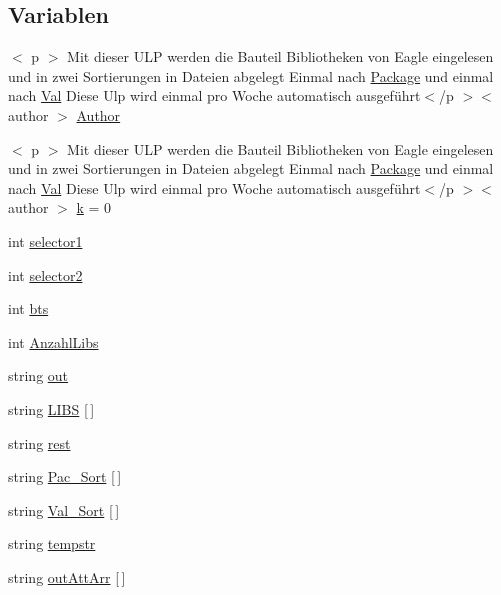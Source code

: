 \subsection*{Variablen}
\begin{DoxyCompactItemize}
\item 
$<$ p $>$ Mit dieser U\+L\+P werden die Bauteil Bibliotheken von Eagle eingelesen und in zwei Sortierungen in Dateien abgelegt Einmal nach \hyperlink{test_8ulp_a36b57fe679881487796855a589fbfb85}{Package} und einmal nach \hyperlink{test_8ulp_a088204f20433deace071409889b5aba1}{Val} Diese Ulp wird einmal pro Woche automatisch ausgeführt$<$/p $>$$<$ author $>$ \hyperlink{readlibs_8ulp_a5060269beb44f9737d13fd98bf0b8f7f}{Author}
\item 
$<$ p $>$ Mit dieser U\+L\+P werden die Bauteil Bibliotheken von Eagle eingelesen und in zwei Sortierungen in Dateien abgelegt Einmal nach \hyperlink{test_8ulp_a36b57fe679881487796855a589fbfb85}{Package} und einmal nach \hyperlink{test_8ulp_a088204f20433deace071409889b5aba1}{Val} Diese Ulp wird einmal pro Woche automatisch ausgeführt$<$/p $>$$<$ author $>$ \hyperlink{readlibs_8ulp_ac4f6835ed9b8d2035ccbb5c7c557fcfc}{k} = 0
\item 
int \hyperlink{readlibs_8ulp_a2f0524c519c9a079ebbe76797552cfff}{selector1}
\item 
int \hyperlink{readlibs_8ulp_acb22ea06df7a98062b750ecca56f1628}{selector2}
\item 
int \hyperlink{readlibs_8ulp_a00c6cb851706bdde7570b25efe80733a}{bts}
\item 
int \hyperlink{readlibs_8ulp_a6e91c7aa482f3c0a8d826efd565190a3}{Anzahl\+Libs}
\item 
string \hyperlink{readlibs_8ulp_a43b9274914173cbec050c89b07f1824b}{out}
\item 
string \hyperlink{readlibs_8ulp_ab79ee21fe4aae7937f99de5b9c7b7d2c}{L\+I\+B\+S} \mbox{[}$\,$\mbox{]}
\item 
string \hyperlink{readlibs_8ulp_afdccf00f7f9b4c4daf90921260c72e92}{rest}
\item 
string \hyperlink{readlibs_8ulp_a530865d3310688a7b794eea8ab03c60b}{Pac\+\_\+\+Sort} \mbox{[}$\,$\mbox{]}
\item 
string \hyperlink{readlibs_8ulp_a08666752575cacdcfcc8699eb3c95022}{Val\+\_\+\+Sort} \mbox{[}$\,$\mbox{]}
\item 
string \hyperlink{readlibs_8ulp_a03ca86bb44d6d953219c512adb218dbb}{tempstr}
\item 
string \hyperlink{readlibs_8ulp_a801e8dfc827f7961b6012c0100f77ab4}{out\+Att\+Arr} \mbox{[}$\,$\mbox{]}

\end{DoxyCompactItemize}
